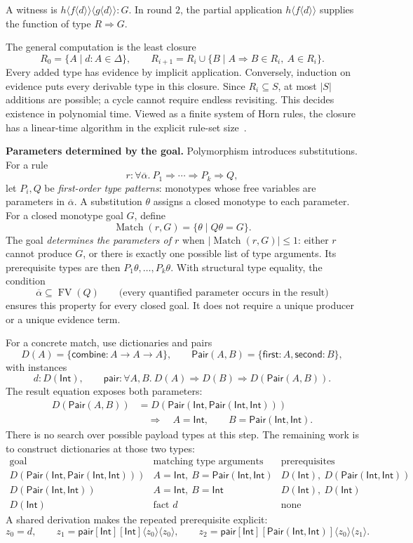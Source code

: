 \documentclass[10pt,a4paper]{article}
\newcommand{\Int}{\mathsf{Int}}
\newcommand{\iarg}[1]{\langle#1\rangle}
\newcommand{\kw}[1]{\mathsf{#1}}
\begin{document}
A witness is $h\iarg{f\iarg{d}}\iarg{g\iarg{d}}:G$. In round $2$, the partial application
$h\iarg{f\iarg{d}}$ supplies the function of type $R\Rightarrow G$.

The general computation is the least closure
\[
 R_0=\{A\mid d:A\in\Delta\},\qquad
 R_{i+1}=R_i\cup\{B\mid A\Rightarrow B\in R_i,\ A\in R_i\}.
\]
Every added type has evidence by implicit application. Conversely, induction on
evidence puts every derivable type in this closure. Since $R_i\subseteq S$,
at most $|S|$ additions are possible; a cycle cannot require endless revisiting.
This decides existence in polynomial time. Viewed as a finite system of Horn rules,
the closure has a linear-time algorithm in the explicit rule-set size~\cite{dowling1984}.

\newpage
\textbf{Parameters determined by the goal.}
Polymorphism introduces substitutions. For a rule
\[
 r:\forall\overline\alpha.\ P_1\Rightarrow\cdots\Rightarrow P_k\Rightarrow Q,
\]
let $P_i,Q$ be \emph{first-order type patterns}: monotypes whose free variables
are parameters in $\overline\alpha$. A substitution $\theta$ assigns a closed
monotype to each parameter. For a closed monotype goal $G$, define
\[
 \operatorname{Match}(r,G)=\{\theta\mid Q\theta=G\}.
\]
The goal \emph{determines the parameters of $r$} when
$|\operatorname{Match}(r,G)|\leq1$: either $r$ cannot produce $G$, or there is
exactly one possible list of type arguments. Its prerequisite types are then
$P_1\theta,\ldots,P_k\theta$.
With structural type equality, the condition
\[
 \overline\alpha\subseteq\operatorname{FV}(Q)
 \qquad\text{(every quantified parameter occurs in the result)}
\]
ensures this property for every closed goal. It does not require a unique
producer or a unique evidence term.

For a concrete match, use dictionaries and pairs
\[
 D(A)=\{\kw{combine}:A\to A\to A\},\qquad
 \kw{Pair}(A,B)=\{\kw{first}:A,\kw{second}:B\},
\]
with instances
\[
 d:D(\Int),\qquad
 \kw{pair}:\forall A,B.\ D(A)\Rightarrow D(B)\Rightarrow D(\kw{Pair}(A,B)).
\]
The result equation exposes both parameters:
\[
\begin{aligned}
 D(\kw{Pair}(A,B))&=D(\kw{Pair}(\Int,\kw{Pair}(\Int,\Int)))\\
 &\quad\Longrightarrow\quad
 \boxed{A=\Int,\qquad B=\kw{Pair}(\Int,\Int).}
\end{aligned}
\]
There is no search over possible payload types at this step. The remaining work is
to construct dictionaries at those two types:
\[
\begin{array}{c|c|c}
 \text{goal} & \text{matching type arguments} & \text{prerequisites}\\ \hline
 D(\kw{Pair}(\Int,\kw{Pair}(\Int,\Int)))
   & A=\Int,\ B=\kw{Pair}(\Int,\Int)
   & D(\Int),\ D(\kw{Pair}(\Int,\Int))\\[2pt]
 D(\kw{Pair}(\Int,\Int))
   & A=\Int,\ B=\Int & D(\Int),\ D(\Int)\\[2pt]
 D(\Int) & \text{fact }d & \text{none}
\end{array}
\]
A shared derivation makes the repeated prerequisite explicit:
\[
 z_0=d,\qquad
 z_1=\kw{pair}[\Int][\Int]\iarg{z_0}\iarg{z_0},\qquad
 z_2=\kw{pair}[\Int][\kw{Pair}(\Int,\Int)]\iarg{z_0}\iarg{z_1}.
\]
\end{document}
